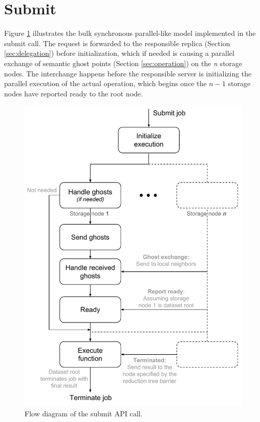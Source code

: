 \section{Submit} \label{sec:submit}
Figure \ref{fig:submit-job} illustrates the bulk synchronous parallel-like model implemented in the submit call. The request is forwarded to the responsible replica (Section \ref{sec:delegation}) before initialization, which if needed is causing a parallel exchange of semantic ghost points (Section \ref{sec:operation}) on the \textit{n} storage nodes. The interchange happens before the responsible server is initializing the parallel execution of the actual operation, which begins once the $n-1$ storage nodes have reported ready to the root node.
\newline

\begin{figure}
	\centering
	\includegraphics[scale=0.7]{pdf/submit-job.pdf}
	\caption{Flow diagram of the submit API call. \label{fig:submit-job}}
\end{figure}	

